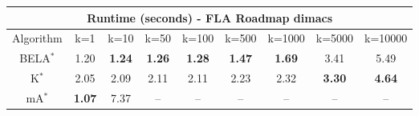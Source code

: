 \begin{tabular}{c|cccccccc}\toprule
\multicolumn{9}{c}{Runtime (seconds) - FLA Roadmap dimacs}\\ \midrule
Algorithm & k=1 & k=10 & k=50 & k=100 & k=500 & k=1000 & k=5000 & k=10000 \\ \midrule
BELA$^*$ & 1.20 & \textbf{1.24} & \textbf{1.26} & \textbf{1.28} & \textbf{1.47} & \textbf{1.69} & 3.41 & 5.49 \\
K$^*$ & 2.05 & 2.09 & 2.11 & 2.11 & 2.23 & 2.32 & \textbf{3.30} & \textbf{4.64} \\
mA$^*$ & \textbf{1.07} & 7.37 & -- & -- & -- & -- & -- & -- \\ \bottomrule 
\end{tabular}
